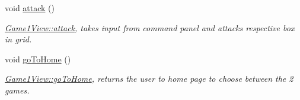 \begin{DoxyCompactItemize}
\mbox{\label{classGame1View_ac6867d86cfd279dd2a4723274af33564}} 
void \hyperlink{classGame1View_ac6867d86cfd279dd2a4723274af33564}{attack} ()
\begin{DoxyCompactList}\small\item\em \hyperlink{classGame1View_ac6867d86cfd279dd2a4723274af33564}{Game1\+View\+::attack}, takes input from command panel and attacks respective box in grid. \end{DoxyCompactList}\item 
\mbox{\label{classGame1View_a6836a99c180e8dab53af1c8575993dec}} 
void \hyperlink{classGame1View_a6836a99c180e8dab53af1c8575993dec}{go\+To\+Home} ()
\begin{DoxyCompactList}\small\item\em \hyperlink{classGame1View_a6836a99c180e8dab53af1c8575993dec}{Game1\+View\+::go\+To\+Home}, returns the user to home page to choose between the 2 games. \end{DoxyCompactList}\end{DoxyCompactItemize}
